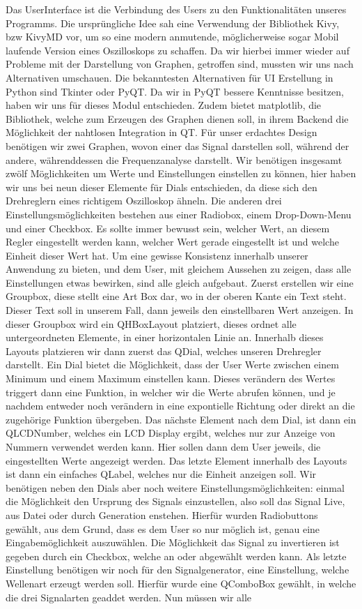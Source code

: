 \documentclass{article}
\begin{document}
Das UserInterface ist die Verbindung des Users zu den Funktionalitäten unseres Programms. Die ursprüngliche Idee sah eine Verwendung der Bibliothek Kivy, bzw KivyMD vor, um so eine modern anmutende, möglicherweise sogar Mobil laufende Version eines Oszilloskops zu schaffen. Da wir hierbei immer wieder auf Probleme mit der Darstellung von Graphen, getroffen sind, mussten wir uns nach Alternativen umschauen. Die bekanntesten Alternativen für UI Erstellung in Python sind Tkinter oder PyQT. Da wir in PyQT bessere Kenntnisse besitzen, haben wir uns für dieses Modul entschieden. Zudem bietet matplotlib, die Bibliothek, welche zum Erzeugen des Graphen dienen soll, in ihrem Backend die Möglichkeit der nahtlosen Integration in QT. Für unser erdachtes Design benötigen wir zwei Graphen, wovon einer das Signal darstellen soll, während der andere, währenddessen die Frequenzanalyse darstellt. Wir benötigen insgesamt zwölf Möglichkeiten um Werte und Einstellungen einstellen zu können, hier haben wir uns bei neun dieser Elemente für Dials entschieden, da diese sich den Drehreglern eines richtigem Oszilloskop ähneln. Die anderen drei Einstellungsmöglichkeiten bestehen aus einer Radiobox, einem Drop-Down-Menu und einer Checkbox. Es sollte immer bewusst sein, welcher Wert, an diesem Regler eingestellt werden kann, welcher Wert gerade eingestellt ist und welche Einheit dieser Wert hat. Um eine gewisse Konsistenz innerhalb unserer Anwendung zu bieten, und dem User, mit gleichem Aussehen zu zeigen, dass alle Einstellungen etwas bewirken, sind alle gleich aufgebaut. Zuerst erstellen wir eine Groupbox, diese stellt eine Art Box dar, wo in der oberen Kante ein Text steht. Dieser Text soll in unserem Fall, dann jeweils den einstellbaren Wert anzeigen. In dieser Groupbox wird ein QHBoxLayout platziert, dieses ordnet alle untergeordneten Elemente, in einer horizontalen Linie an. Innerhalb dieses Layouts platzieren wir dann zuerst das QDial, welches unseren Drehregler darstellt. Ein Dial bietet die Möglichkeit, dass der User Werte zwischen einem Minimum und einem Maximum einstellen kann. Dieses verändern des Wertes triggert dann eine Funktion, in welcher wir die Werte abrufen können, und je nachdem entweder noch verändern in eine expontielle Richtung oder direkt an die zugehörige Funktion übergeben. Das nächste Element nach dem Dial, ist dann ein QLCDNumber, welches ein LCD Display ergibt, welches nur zur Anzeige von Nummern verwendet werden kann. Hier sollen dann dem User jeweils, die eingestellten Werte angezeigt werden. Das letzte Element innerhalb des Layouts ist dann ein einfaches QLabel, welches nur die Einheit anzeigen soll. Wir benötigen neben den Dials aber noch weitere Einstellungsmöglichkeiten: einmal die Möglichkeit den Ursprung des Signals einzustellen, also soll das Signal Live, aus Datei oder durch Generation enstehen. Hierfür wurden Radiobuttons gewählt, aus dem Grund, dass es dem User so nur möglich ist, genau eine Eingabemöglichkeit auszuwählen. Die Möglichkeit das Signal zu invertieren ist gegeben durch ein Checkbox, welche an oder abgewählt werden kann. Als letzte Einstellung benötigen wir noch für den Signalgenerator, eine Einstellung, welche Wellenart erzeugt werden soll. Hierfür wurde eine QComboBox gewählt, in welche die drei Signalarten geaddet werden. Nun müssen wir alle 
\end{document}
